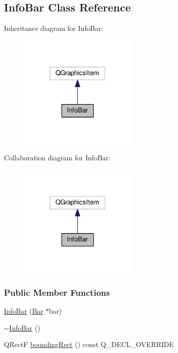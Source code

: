 \hypertarget{class_info_bar}{}\subsection{Info\+Bar Class Reference}
\label{class_info_bar}


Inheritance diagram for Info\+Bar\+:
\nopagebreak
\begin{figure}[H]
\begin{center}
\leavevmode
\includegraphics[width=163pt]{class_info_bar__inherit__graph}
\end{center}
\end{figure}


Collaboration diagram for Info\+Bar\+:
\nopagebreak
\begin{figure}[H]
\begin{center}
\leavevmode
\includegraphics[width=163pt]{class_info_bar__coll__graph}
\end{center}
\end{figure}
\subsubsection*{Public Member Functions}
\begin{DoxyCompactItemize}
\item 
\hyperlink{class_info_bar_aab5c08f226901c8827a97efbdfb5122a}{Info\+Bar} (\hyperlink{class_bar}{Bar} $\ast$bar)
\item 
\hyperlink{class_info_bar_a954baa28d750739c80c029818d267d8e}{$\sim$\+Info\+Bar} ()
\item 
Q\+Rect\+F \hyperlink{class_info_bar_a564aacb3b64bdb5fbcaef8a432a0b49e}{bounding\+Rect} () const Q\+\_\+\+D\+E\+C\+L\+\_\+\+O\+V\+E\+R\+R\+I\+D\+E
\end{DoxyCompactItemize}
